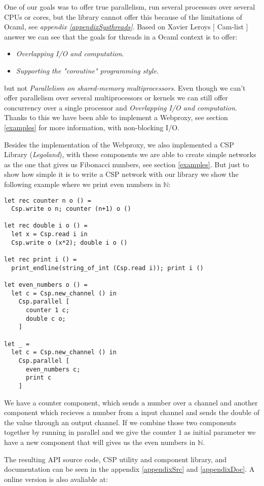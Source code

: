 \documentclass[a4paper,12pt]{article}
\begin{document}
One of our goals was to offer true parallelism, run several processors
over several CPUs or cores, but the library cannot offer this because of the
limitations of Ocaml, see {\it appendix \ref{appendixSysthreads}}. Based on
Xavier Leroys $[$ Cam-list $]$ answer we can see that the goals for threads in a
Ocaml context is to offer:
\begin{itemize}
 \item {\it Overlapping I/O and computation}.
 \item {\it Supporting the "coroutine" programming style}.
\end{itemize}
but not {\it Parallelism on shared-memory multiprocessors}. Even though we can't
offer parallelism over several multiprocessors or kernels we can still offer
concurrency over a single processor and {\it Overlapping I/O and computation}.
Thanks to this we have been able to implement a Webproxy, see section
\ref{examples} for more information, with non-blocking I/O.

Besides the implementation of the Webproxy, we also implemented a CSP
Library ({\it Legoland\cite{vinterpycsp}}), with these components we are able to
create simple networks as the one that gives us Fibonacci numbers, see section
\ref{examples}. But just to show how simple it is to write a CSP network with
our library we show the following example where we print even numbers in
$\mathbb{N}$:
\newpage
\begin{verbatim}
let rec counter n o () =
  Csp.write o n; counter (n+1) o ()

let rec double i o () =
  let x = Csp.read i in
  Csp.write o (x*2); double i o ()

let rec print i () =
  print_endline(string_of_int (Csp.read i)); print i ()

let even_numbers o () =
  let c = Csp.new_channel () in
    Csp.parallel [
      counter 1 c;
      double c o;
    ]

let _ =
  let c = Csp.new_channel () in
    Csp.parallel [
      even_numbers c;
      print c
    ]
\end{verbatim}
We have a counter component, which sends a number over a channel and another
component which recieves a number from a input channel and sends the
double of the value through an output channel. If we combine those two
components together by running in parallel and we give the counter $1$ as
initial parameter we have a new component that will gives us the even numbers in
$\mathbb{N}$.

The resulting API source code, CSP utility and component library, and
documentation can be seen in the appendix \ref{appendixSrc} and \ref{appendixDoc}.
A online version is also avaliable at:
\end{document}
